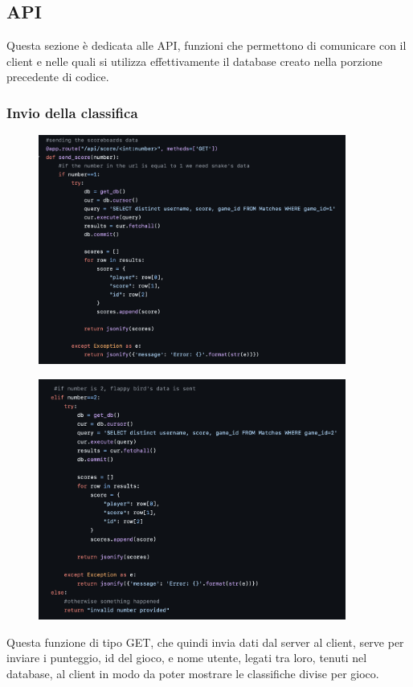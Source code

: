 \documentclass{article}
\begin{document}
\subsection{API}
Questa sezione è dedicata alle API, funzioni che permettono di comunicare con il client e nelle quali si utilizza effettivamente il database creato nella porzione precedente di codice.

\subsubsection{Invio della classifica}
\begin{figure}[H]
    \centering
    \includegraphics[width=0.9\textwidth]{images/invio_classifica1.png}
\end{figure}

\begin{figure}[H]
    \centering
    \includegraphics[width=0.9\textwidth]{images/invio_classifica2.png}
\end{figure}
Questa funzione di tipo GET, che quindi invia dati dal server al client, serve per inviare i punteggio, id del gioco, e nome utente, legati tra loro, tenuti nel database, al client in modo da poter mostrare le classifiche divise per gioco.
\end{document}

